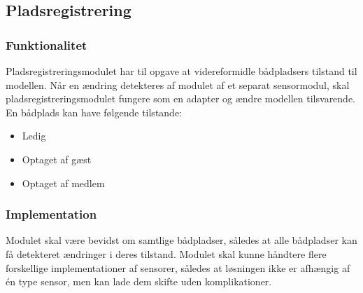 \subsection{Pladsregistrering}
\label{sub:plads_registrering}

\subsubsection{Funktionalitet}
\label{ssub:Funktionalitet}

Pladsregistreringsmodulet har til opgave at videreformidle bådpladsers tilstand til modellen. Når en ændring detekteres af modulet af et separat sensormodul, skal pladsregistreringsmodulet fungere som en adapter og ændre modellen tilsvarende. En bådplads kan have følgende tilstande:

\begin{itemize}
  \item Ledig
  \item Optaget af gæst
  \item Optaget af medlem
\end{itemize}



\subsubsection{Implementation}
\label{ssub:plads_implementation}

Modulet skal være bevidst om samtlige bådpladser, således at alle bådpladser kan få detekteret ændringer i deres tilstand. 
Modulet skal kunne håndtere flere forskellige implementationer af sensorer, således at løsningen ikke er afhængig af én type sensor, men kan lade dem skifte uden komplikationer.